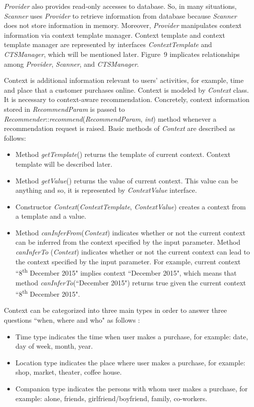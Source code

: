 \documentclass[a4paper]{llncs}
\begin{document}
\textit{Provider} also provides read-only accesses to database. So, in many situations, \textit{Scanner} uses \textit{Provider} to retrieve information from database because \textit{Scanner} does not store information in memory. Moreover, \textit{Provider} manipulates context information via context template manager. Context template and context template manager are represented by interfaces \textit{ContextTemplate} and \textit{CTSManager}, which will be mentioned later. Figure~9 implicates relationships among \textit{Provider}, \textit{Scanner}, and \textit{CTSManager}. 

Context is additional information relevant to users' activities, for example, time and place that a customer purchases online. Context is modeled by \textit{Context} class. It is necessary to context-aware recommendation. Concretely, context information stored in \textit{RecommendParam} is passed to \textit{Recommender}::\textit{recommend}(\textit{RecommendParam}, \textit{int}) method whenever a recommendation request is raised. Basic methods of \textit{Context} are described as follows:
\begin{itemize}
\item Method \textit{getTemplate}() returns the template of current context. Context template will be described later.
\item Method \textit{getValue}() returns the value of current context. This value can be anything and so, it is represented by \textit{ContextValue} interface.
\item Constructor \textit{Context}(\textit{ContextTemplate}, \textit{ContextValue}) creates a context from a template and a value.
\item Method \textit{canInferFrom}(\textit{Context}) indicates whether or not the current context can be inferred from the context specified by the input parameter. Method \textit{canInferTo} (\textit{Context}) indicates whether or not the current context can lead to the context specified by the input parameter. For example, current context ``8\textsuperscript{th} December 2015" implies context ``December 2015", which means that method \textit{canInferTo}(``December 2015") returns true given the current context ``8\textsuperscript{th} December 2015".
\end{itemize}
Context can be categorized into three main types in order to answer three questions ``when, where and who" as follows \cite[pp. 224-225]{ricci2011}:
\begin{itemize}
\item Time type indicates the time when user makes a purchase, for example: date, day of week, month, year.
\item Location type indicates the place where user makes a purchase, for example: shop, market, theater, coffee house.
\item Companion type indicates the persons with whom user makes a purchase, for example: alone, friends, girlfriend/boyfriend, family, co-workers.
\end{itemize}
\end{document}

